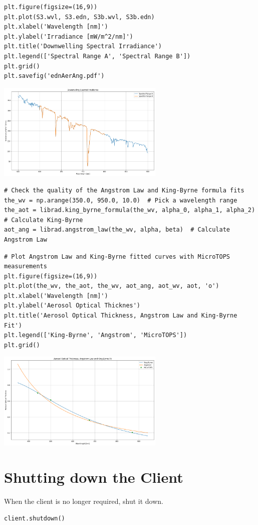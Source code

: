 \begin{lstlisting}[style=tinysize]
plt.figure(figsize=(16,9))
plt.plot(S3.wvl, S3.edn, S3b.wvl, S3b.edn)
plt.xlabel('Wavelength [nm]')
plt.ylabel('Irradiance [mW/m^2/nm]')
plt.title('Downwelling Spectral Irradiance')
plt.legend(['Spectral Range A', 'Spectral Range B'])
plt.grid()
plt.savefig('ednAerAng.pdf')
\end{lstlisting}

\begin{center}
\includegraphics[width=0.6\textwidth]{./pic/libraddaskTemplate_13_0.png}
\end{center}


\begin{lstlisting}[style=tinysize]
# Check the quality of the Angstrom Law and King-Byrne formula fits
the_wv = np.arange(350.0, 950.0, 10.0)  # Pick a wavelength range
the_aot = librad.king_byrne_formula(the_wv, alpha_0, alpha_1, alpha_2)  # Calculate King-Byrne 
aot_ang = librad.angstrom_law(the_wv, alpha, beta)  # Calculate Angstrom Law
\end{lstlisting}


\begin{lstlisting}[style=tinysize]
# Plot Angstrom Law and King-Byrne fitted curves with MicroTOPS measurements
plt.figure(figsize=(16,9))
plt.plot(the_wv, the_aot, the_wv, aot_ang, aot_wv, aot, 'o')
plt.xlabel('Wavelength [nm]')
plt.ylabel('Aerosol Optical Thicknes')
plt.title('Aerosol Optical Thickness, Angstrom Law and King-Byrne Fit')
plt.legend(['King-Byrne', 'Angstrom', 'MicroTOPS'])
plt.grid()

\end{lstlisting}

\begin{center}
\includegraphics[width=0.6\textwidth]{./pic/libraddaskTemplate_15_0.png}
\end{center}


\section{Shutting down the Client}
\label{sec:ShuttingdowntheClient}

When the client is no longer required, shut it down.
\begin{lstlisting}[style=tinysize]
client.shutdown()
\end{lstlisting}
